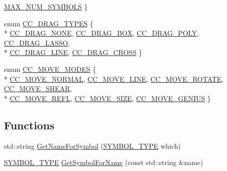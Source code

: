 \begin{DoxyCompactItemize}
\hyperlink{a00216_a68cd84e0300be6f9ff4474682762c9eea87b0cb9826d624c9af683d76e0d506f7}{M\-A\-X\-\_\-\-N\-U\-M\-\_\-\-S\-Y\-M\-B\-O\-L\-S}
 \}
\item 
enum \hyperlink{a00216_a0fc7c44466a98380192d425c98f22aa6}{C\-C\-\_\-\-D\-R\-A\-G\-\_\-\-T\-Y\-P\-E\-S} \{ \\*
\hyperlink{a00216_a0fc7c44466a98380192d425c98f22aa6a71d4ef91bbe2bb1684a18d3b5ad296ab}{C\-C\-\_\-\-D\-R\-A\-G\-\_\-\-N\-O\-N\-E}, 
\hyperlink{a00216_a0fc7c44466a98380192d425c98f22aa6a8838b28e2930f2b5089a29a8040fa6aa}{C\-C\-\_\-\-D\-R\-A\-G\-\_\-\-B\-O\-X}, 
\hyperlink{a00216_a0fc7c44466a98380192d425c98f22aa6a68f3115873554c96a8e12033ad73aad1}{C\-C\-\_\-\-D\-R\-A\-G\-\_\-\-P\-O\-L\-Y}, 
\hyperlink{a00216_a0fc7c44466a98380192d425c98f22aa6a8f5989f52816937ac45b5741aa42527e}{C\-C\-\_\-\-D\-R\-A\-G\-\_\-\-L\-A\-S\-S\-O}, 
\\*
\hyperlink{a00216_a0fc7c44466a98380192d425c98f22aa6ad36dcfa7330d46871045665cda5e849b}{C\-C\-\_\-\-D\-R\-A\-G\-\_\-\-L\-I\-N\-E}, 
\hyperlink{a00216_a0fc7c44466a98380192d425c98f22aa6a414a1183ca4be4e13dad01f6745a597a}{C\-C\-\_\-\-D\-R\-A\-G\-\_\-\-C\-R\-O\-S\-S}
 \}
\item 
enum \hyperlink{a00216_a45558d38ac05e98ebdbffa5756372654}{C\-C\-\_\-\-M\-O\-V\-E\-\_\-\-M\-O\-D\-E\-S} \{ \\*
\hyperlink{a00216_a45558d38ac05e98ebdbffa5756372654a739e9365eada265dc0de8fd94f07fdb7}{C\-C\-\_\-\-M\-O\-V\-E\-\_\-\-N\-O\-R\-M\-A\-L}, 
\hyperlink{a00216_a45558d38ac05e98ebdbffa5756372654ae384b96ee9639fa256ace9860781b95a}{C\-C\-\_\-\-M\-O\-V\-E\-\_\-\-L\-I\-N\-E}, 
\hyperlink{a00216_a45558d38ac05e98ebdbffa5756372654af60ab5ad5d9dbcf9ae24d597c0881ce9}{C\-C\-\_\-\-M\-O\-V\-E\-\_\-\-R\-O\-T\-A\-T\-E}, 
\hyperlink{a00216_a45558d38ac05e98ebdbffa5756372654a37a921549474ab000d0788b830e20ebc}{C\-C\-\_\-\-M\-O\-V\-E\-\_\-\-S\-H\-E\-A\-R}, 
\\*
\hyperlink{a00216_a45558d38ac05e98ebdbffa5756372654ac55966a94b6dc0e6f9728417122f9539}{C\-C\-\_\-\-M\-O\-V\-E\-\_\-\-R\-E\-F\-L}, 
\hyperlink{a00216_a45558d38ac05e98ebdbffa5756372654af44659f22b769c25dfb9667ca84e24c5}{C\-C\-\_\-\-M\-O\-V\-E\-\_\-\-S\-I\-Z\-E}, 
\hyperlink{a00216_a45558d38ac05e98ebdbffa5756372654a2cfd7bd648978cda74dc33ca1537dae0}{C\-C\-\_\-\-M\-O\-V\-E\-\_\-\-G\-E\-N\-I\-U\-S}
 \}
\end{DoxyCompactItemize}
\subsection*{Functions}
\begin{DoxyCompactItemize}
\item 
std\-::string \hyperlink{a00216_a2d4f0cf91f506b230102e3d344bfddbe}{Get\-Name\-For\-Symbol} (\hyperlink{a00216_a68cd84e0300be6f9ff4474682762c9ee}{S\-Y\-M\-B\-O\-L\-\_\-\-T\-Y\-P\-E} which)
\item 
\hyperlink{a00216_a68cd84e0300be6f9ff4474682762c9ee}{S\-Y\-M\-B\-O\-L\-\_\-\-T\-Y\-P\-E} \hyperlink{a00216_a4223736e0f1971c520270427c3d6d28e}{Get\-Symbol\-For\-Name} (const std\-::string \&name)
\end{DoxyCompactItemize}


